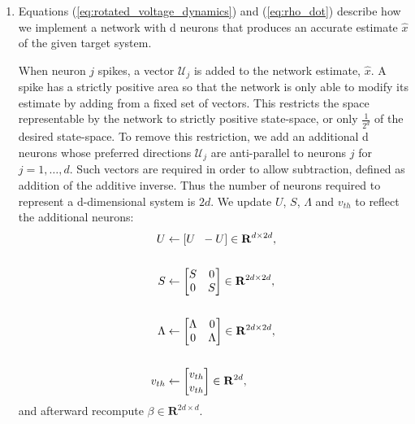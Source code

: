 \begin{enumerate}
\item Equations (\ref{eq:rotated_voltage_dynamics}) and (\ref{eq:rho_dot}) describe how we implement a network with d neurons that produces an accurate estimate $\hat{x}$ of the given target system. 


When neuron $j$ spikes, a vector $\mathcal{U}_j$ is added to the network estimate, $\hat{x}$. A spike has a strictly positive area so that the network is only able to modify its estimate by adding from a fixed set of vectors.  This restricts the space representable by the network to strictly positive state-space, or only $\frac{1}{2^d}$ of the desired state-space. To remove this restriction, we add an additional d neurons whose preferred directions $\mathcal{U}_j$ are anti-parallel to neurons $j$ for $j=1, \ldots, d$. Such vectors are required in order to allow subtraction, defined as addition of the additive inverse. Thus the number of neurons required to represent a d-dimensional system is $2d$. We update $U$, $S$, $\Lambda$ and $v_{th}$ to reflect the additional neurons:
\begin{align*}
    U &\leftarrow \left[ U \hspace{2mm} -U\right] \in \mathbf{R}^{d \times 2 d},\\
    \\
    S &\leftarrow
    \begin{bmatrix}
    S & 0 \\ 0 & S
    \end{bmatrix}
    \in \mathbf{R}^{2 d \times 2 d},\\
    \\
    \Lambda &\leftarrow
    \begin{bmatrix}
    \Lambda & 0 \\ 0 & \Lambda
    \end{bmatrix}
    \in \mathbf{R}^{2 d \times 2 d},\\
    \\
    v_{th} &\leftarrow 
    \begin{bmatrix}
    v_{th} \\ v_{th}
    \end{bmatrix} \in \mathbf{R}^{2d},
\end{align*}
and afterward recompute $\beta \in \mathbf{R}^{2 d \times d}$. 

\end{enumerate}

